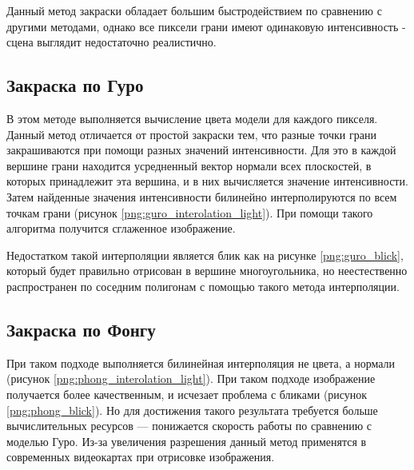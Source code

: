 Данный метод закраски обладает большим быстродействием по сравнению с другими методами, однако все пиксели грани имеют одинаковую интенсивность - сцена выглядит недостаточно реалистично.

\subsection{Закраска по Гуро}
В этом методе выполняется вычисление цвета модели для каждого пикселя\cite{guro_shading}. Данный метод отличается от простой закраски тем, что разные точки грани закрашиваются при помощи  разных значений интенсивности. Для это в каждой вершине грани находится усредненный вектор нормали всех плоскостей, в которых принадлежит эта вершина, и в них вычисляется значение интенсивности. Затем найденные значения интенсивности билинейно интерполируются по всем точкам грани (рисунок \ref{png:guro_interolation_light}). При помощи такого алгоритма получится сглаженное изображение.

\begin{figure}[H]
\end{figure}

Недостатком такой интерполяции является блик как на рисунке \ref{png:guro_blick}, который будет правильно отрисован в вершине многоугольника, но неестественно распространен по соседним полигонам с помощью такого метода интерполяции.

\begin{figure}[H]
\end{figure}

\subsection{Закраска по Фонгу}
При таком подходе выполняется билинейная интерполяция не цвета, а нормали (рисунок \ref{png:phong_interolation_light}). При таком подходе изображение получается более качественным, и исчезает проблема с бликами (рисунок \ref{png:phong_blick}). Но для достижения такого результата требуется больше вычислительных ресурсов — понижается скорость работы по сравнению с моделью Гуро. Из-за увеличения разрешения данный метод применятся в современных видеокартах при отрисовке изображения.

